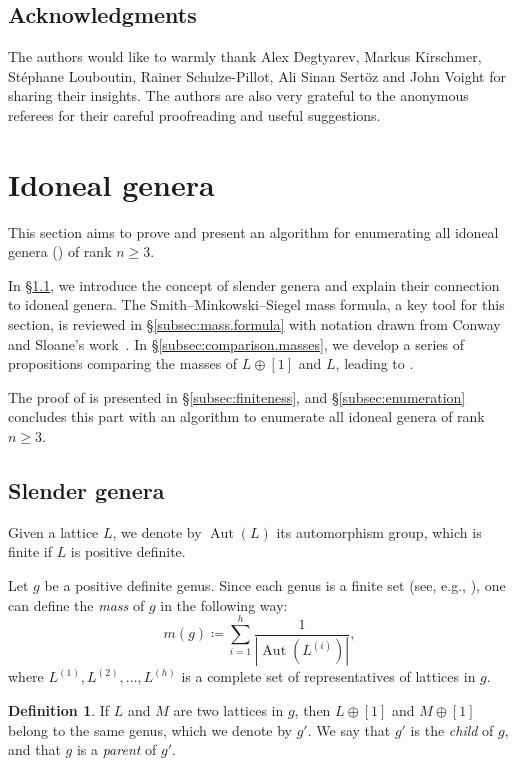 \documentclass[a4paper]{amsart}
\theoremstyle{definition}
\newtheorem{definition}{Definition}[section]
\theoremstyle{plain}
\DeclareMathOperator{\Aut}{Aut}
\begin{document}
\subsection*{Acknowledgments}
The authors would like to warmly thank Alex Degtyarev, Markus Kirschmer, Stéphane Louboutin, Rainer Schulze-Pillot, Ali Sinan Sertöz and John Voight for sharing their insights.
The authors are also very grateful to the anonymous referees for their careful proofreading and useful suggestions.



\section{Idoneal genera}\label{sec:idoneal.genera} 


This section aims to prove  and present an algorithm for enumerating all idoneal genera () of rank \(n \geq 3\).

In §\ref{subsec:parent}, we introduce the concept of slender genera and explain their connection to idoneal genera. The Smith--Minkowski--Siegel mass formula, a key tool for this section, is reviewed in §\ref{subsec:mass.formula} with notation drawn from Conway and Sloane's work~\cite{ConwaySloane88}. In §\ref{subsec:comparison.masses}, we develop a series of propositions comparing the masses of \(L \oplus [1]\) and \(L\), leading to . 

The proof of  is presented in §\ref{subsec:finiteness}, and §\ref{subsec:enumeration} concludes this part with an algorithm to enumerate all idoneal genera of rank \(n \geq 3\).

\subsection{Slender genera} \label{subsec:parent}
Given a lattice \(L\), we denote by \(\Aut(L)\) its automorphism group, which is finite if \(L\) is positive definite.

Let \(g\) be a positive definite genus. Since each genus is a finite set (see, e.g., \cite[Kapitel VII, Satz (21.3)]{kneser}), one can define the \emph{mass} of \(g\) in the following way:
\[
    m(g) \coloneqq \sum_{i = 1}^h \frac{1}{|{\Aut(L^{(i)})}|},
\]
where \(L^{(1)},  L^{(2)}, \ldots, L^{(h)}\) is a complete set of representatives of lattices in \(g\).

\begin{definition} \label{def:parent}
    If \(L\) and \(M\) are two lattices in \(g\), then \(L \oplus [1]\) and \(M \oplus [1]\) belong to the same genus, which we denote by \(g'\). We say that \(g'\) is the \emph{child} of \(g\), and that \(g\) is a \emph{parent} of \(g'\).
\end{definition}
\end{document}
